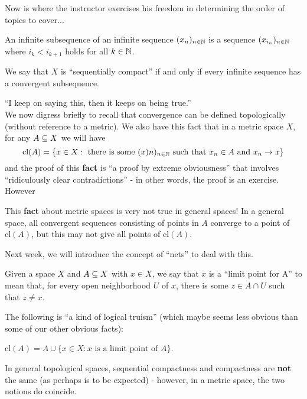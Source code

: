 Now is where the instructor exercises his freedom in determining the order of topics to cover...

\begin{boxdefinition}[Subsequence]
    An infinite subsequence of an infinite sequence $(x_n)_{n \in \mathbb{N}}$ is a sequence $(x_{i_n})_{n \in \mathbb{N}}$ where $i_{k}<i_{k+1}$ holds for all $k\in \mathbb{N}$.
\end{boxdefinition}
\begin{boxdefinition}
    We say that $X$ is ``sequentially compact'' if and only if every infinite sequence has a convergent subsequence.
\end{boxdefinition}
``I keep on saying this, then it keeps on being true.''\\

We now digress briefly to recall that convergence can be defined topologically (without reference to a metric). We also have this fact that in a metric space $X$, for any $A\subseteq X$ we will have $$\text{cl}(A)=\{x\in X: \text{ there is some }(x)n)_{n\in \mathbb{N}}\text{ such that }x_n\in A\text{ and }x_n\rightarrow x\}$$ and the proof of this \textbf{fact} is ``a proof by extreme obviousness'' that involves ``ridiculously clear contradictions'' - in other words, the proof is an exercise. However
\begin{boxwarning}
    This \textbf{fact} about metric spaces is very not true in general spaces! In a general space, all convergent sequences consisting of points in $A$ converge to a point of $\text{cl}(A)$, but this may not give all points of $\text{cl}(A)$.
\end{boxwarning}
Next week, we will introduce the concept of ``nets'' to deal with this.
\begin{boxdefinition}
    Given a space $X$ and $A\subseteq X$ with $x\in X$, we say that $x$ is a ``limit point for A'' to mean that, for every open neighborhood $U$ of $x$, there is some $z\in A\cap U$ such that $z\neq x$.
\end{boxdefinition}
The following is ``a kind of logical truism'' (which maybe seems less obvious than some of our other obvious facts):
\begin{boxlemma}
    cl$(A)=A\cup \{x\in X: x\text{ is a limit point of }A\}$.
\end{boxlemma}

In general topological spaces, sequential compactness and compactness are \textbf{not} the same (as perhaps is to be expected) - however, in a metric space, the two notions do coincide.

